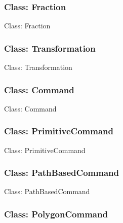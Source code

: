 \documentclass[11pt,twoside,openany,x11names,svgnames]{memoir}
\begin{document}
\subsubsection{Class: Fraction}\label{Class-Fraction}

Class: Fraction

\subsubsection{Class: Transformation}\label{Class-Transformation}

Class: Transformation

\subsubsection{Class: Command}\label{Class-Command}

Class: Command

\subsubsection{Class: PrimitiveCommand}\label{Class-PrimitiveCommand}

Class: PrimitiveCommand

\subsubsection{Class: PathBasedCommand}\label{Class-PathBasedCommand}

Class: PathBasedCommand

\subsubsection{Class: PolygonCommand}\label{Class-PolygonCommand}
\end{document}
